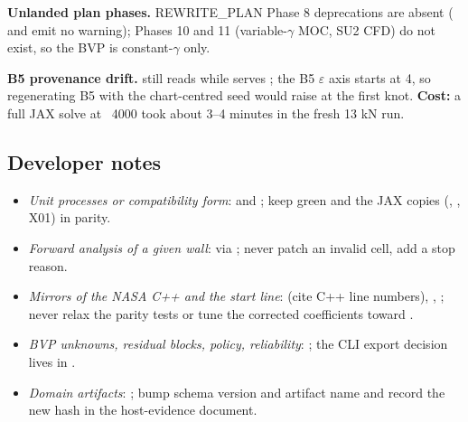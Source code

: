\textbf{Unlanded plan phases.} REWRITE\_PLAN Phase 8 deprecations are absent ( and
 emit no warning); Phases 10 and 11 (variable-$\gamma$ MOC, SU2 CFD) do not exist, so the BVP is
constant-$\gamma$ only.

\textbf{B5 provenance drift.}  still reads  while
 serves ; the B5 $\varepsilon$ axis starts at 4, so regenerating B5 with
the chart-centred seed would raise at the first knot. \textbf{Cost:} a full JAX solve at ~4000 took about 3--4 minutes in the fresh 13 kN run.

\subsection{Developer notes}

\begin{itemize}
  \item \emph{Unit processes or compatibility form}:  and ; keep
   green and the JAX copies (,
  , X01) in parity.
  \item \emph{Forward analysis of a given wall}:  via ; never patch an
  invalid cell, add a stop reason.
  \item \emph{Mirrors of the NASA C++ and the start line}:  (cite C++ line numbers),
  , ; never relax the parity tests or tune the corrected
  coefficients toward .
  \item \emph{BVP unknowns, residual blocks, policy, reliability}: ; the CLI export
  decision lives in .
  \item \emph{Domain artifacts}: ; bump schema version and artifact name and record
  the new hash in the host-evidence document.
\end{itemize}
